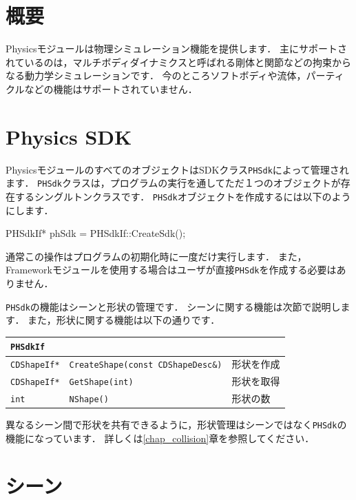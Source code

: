 \section{概要}

Physicsモジュールは物理シミュレーション機能を提供します．
\KLUDGE 主にサポートされているのは，マルチボディダイナミクスと呼ばれる剛体と関節などの拘束からなる動力学シミュレーションです．
\KLUDGE 今のところソフトボディや流体，パーティクルなどの機能はサポートされていません．

\section{Physics SDK}

PhysicsモジュールのすべてのオブジェクトはSDKクラス\texttt{PHSdk}によって管理されます．
\texttt{PHSdk}クラスは，プログラムの実行を通してただ１つのオブジェクトが存在するシングルトンクラスです．
\texttt{PHSdk}オブジェクトを作成するには以下のようにします．
\begin{sourcecode}
PHSdkIf* phSdk = PHSdkIf::CreateSdk();
\end{sourcecode}
\KLUDGE 通常この操作はプログラムの初期化時に一度だけ実行します．
\KLUDGE また，Frameworkモジュールを使用する場合はユーザが直接\texttt{PHSdk}を作成する必要はありません．

\texttt{PHSdk}の機能はシーンと形状の管理です．
\KLUDGE シーンに関する機能は次節で説明します．
\KLUDGE また，形状に関する機能は以下の通りです．

\begin{center}
\begin{tabular}{p{.15\hsize}p{.55\hsize}p{.2\hsize}}
\texttt{PHSdkIf} & &															\\ \midrule
\texttt{CDShapeIf*} & \texttt{CreateShape(const CDShapeDesc\&)}	& 形状を作成	\\
\texttt{CDShapeIf*}	& \texttt{GetShape(int)}					& 形状を取得	\\
\texttt{int}		& \texttt{NShape()}							& 形状の数		\\
\end{tabular}
\end{center}

\KLUDGE 異なるシーン間で形状を共有できるように，形状管理はシーンではなく\texttt{PHSdk}の機能になっています．
\KLUDGE 詳しくは\ref{chap_collision}章を参照してください．

\section{シーン}
\label{sec_physics_scene}

